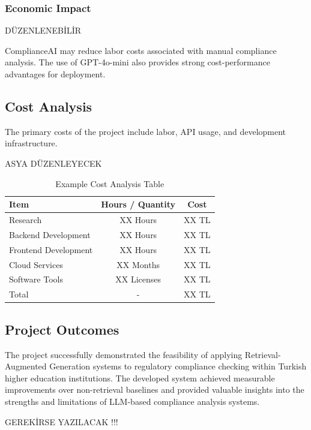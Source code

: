 \documentclass[a4paper,12pt]{article}
\begin{document}
\subsubsection{Economic Impact}
DÜZENLENEBİLİR

\hspace{0.5cm} ComplianceAI may reduce labor costs associated with manual compliance analysis. The use of GPT-4o-mini also provides strong cost-performance advantages for deployment.


\subsection{Cost Analysis}

\hspace{0.5cm} The primary costs of the project include labor, API usage, and development infrastructure.

\begin{table}[H]
\centering
\caption{Example Cost Analysis Table}
ASYA DÜZENLEYECEK
\begin{tabular}{|l|c|c|}
\hline
\textbf{Item} & \textbf{Hours / Quantity} & \textbf{Cost} \\ \hline
Research & XX Hours & XX TL \\ \hline
Backend Development & XX Hours & XX TL \\ \hline
Frontend Development & XX Hours & XX TL \\ \hline
Cloud Services & XX Months & XX TL \\ \hline
Software Tools & XX Licenses & XX TL \\ \hline
Total & - & XX TL \\ \hline
\end{tabular}
\end{table}


\subsection{Project Outcomes}

\hspace{0.5cm} The project successfully demonstrated the feasibility of applying Retrieval-Augmented Generation systems to regulatory compliance checking within Turkish higher education institutions. The developed system achieved measurable improvements over non-retrieval baselines and provided valuable insights into the strengths and limitations of LLM-based compliance analysis systems.


\clearpage



GEREKİRSE YAZILACAK !!!
\end{document}
